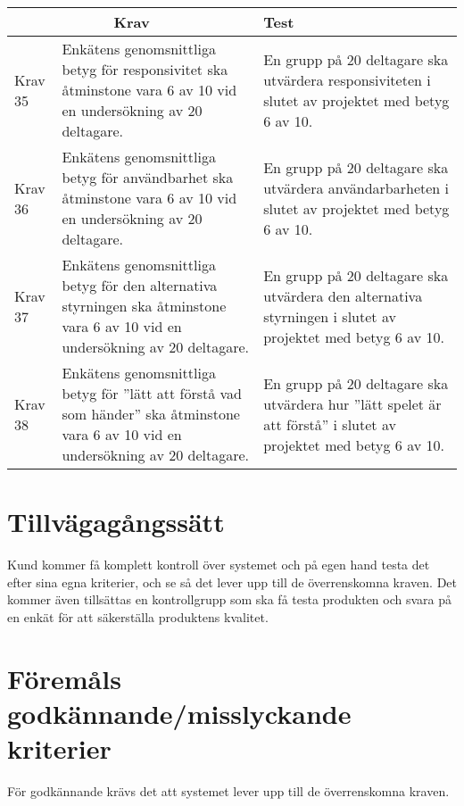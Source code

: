\documentclass[10pt]{article}
\begin{document}
	\begin{tabular}{| p{1.5cm} | p{6cm} | p{8cm}|}
	
  \hline
    \multicolumn{2}{|c|}{Krav}&{Test}\\
    \hline


		Krav 35& Enkätens\cite {bib-kvalitetsplan} genomsnittliga betyg för responsivitet ska åtminstone vara 6 av 10 vid en undersökning av 20 deltagare. & En grupp på 20 deltagare ska utvärdera responsiviteten i slutet av projektet med betyg 6 av 10. \\
		\hline
		Krav 36& Enkätens\cite {bib-kvalitetsplan} genomsnittliga betyg för användbarhet ska åtminstone vara 6 av 10 vid en undersökning av 20 deltagare. & En grupp på 20 deltagare ska utvärdera användarbarheten i slutet av projektet med betyg 6 av 10. \\
		\hline
		Krav 37& Enkätens\cite {bib-kvalitetsplan} genomsnittliga betyg för den alternativa styrningen ska åtminstone vara 6 av 10 vid en undersökning av 20 deltagare. & En grupp på 20 deltagare ska utvärdera den alternativa styrningen i slutet av projektet med betyg 6 av 10. \\
		\hline
		Krav 38&Enkätens\cite{bib-kvalitetsplan} genomsnittliga betyg för ''lätt att förstå vad som händer'' ska åtminstone vara 6 av 10 vid en undersökning av 20 deltagare. & En grupp på 20 deltagare ska utvärdera hur ''lätt spelet är att förstå'' i slutet av projektet med betyg 6 av 10. \\
		\hline

   
  \end{tabular}
  


\section{Tillvägagångssätt}
	Kund kommer få komplett kontroll över systemet och på egen hand testa det efter sina egna kriterier, och se så det lever upp till de överrenskomna kraven. Det kommer även tillsättas en kontrollgrupp som ska få testa produkten och svara på en enkät för att säkerställa produktens kvalitet.
	
	

\section{Föremåls godkännande/misslyckande kriterier}
	För godkännande krävs det att systemet lever upp till de överrenskomna kraven.
\end{document}
